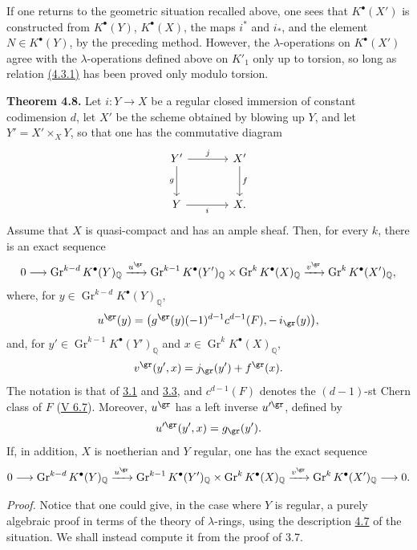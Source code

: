 If one returns to the geometric situation recalled above, one sees that \(K^\bullet(X')\) is constructed from \(K^\bullet(Y)\), \(K^\bullet(X)\), the maps \(i^*\) and \(i_*\), and the element \(N\in K^\bullet(Y)\), by the preceding method. However, the \(\lambda\)-operations on \(K^\bullet(X')\) agree with the \(\lambda\)-operations defined above on \(K'_1\) only up to torsion, so long as relation \hyperlink{sga6.e07.eq.4-3-1}{(4.3.1)} has been proved only modulo torsion.

\textbf{Theorem 4.8.} Let \(i:Y\to X\) be a regular closed immersion of constant codimension \(d\), let \(X'\) be the scheme obtained by blowing up \(Y\), and let \(Y'=X'\times_XY\), so that one has the commutative diagram
\[
\begin{tikzcd}[column sep=large,row sep=large]
Y' \arrow[r,"j"] \arrow[d,"g"'] & X' \arrow[d,"f"]\\
Y \arrow[r,"i"'] & X.
\end{tikzcd}
\]
Assume that \(X\) is quasi-compact and has an ample sheaf. Then, for every \(k\), there is an exact sequence
\[
0\longrightarrow
\operatorname{Gr}^{k-d}K^\bullet(Y)_{\mathbb Q}
\xrightarrow{u^{\gr}}
\operatorname{Gr}^{k-1}K^\bullet(Y')_{\mathbb Q}
\times
\operatorname{Gr}^{k}K^\bullet(X)_{\mathbb Q}
\xrightarrow{v^{\gr}}
\operatorname{Gr}^{k}K^\bullet(X')_{\mathbb Q},
\]
where, for \(y\in \operatorname{Gr}^{k-d}K^\bullet(Y)_{\mathbb Q}\),
\[
  u^{\gr}(y)=
  \bigl(g^{\gr}(y)(-1)^{d-1}c^{d-1}(F),-\,i_{\gr}(y)\bigr),
\]
and, for \(y'\in \operatorname{Gr}^{k-1}K^\bullet(Y')_{\mathbb Q}\) and \(x\in \operatorname{Gr}^{k}K^\bullet(X)_{\mathbb Q}\),
\[
  v^{\gr}(y',x)=j_{\gr}(y')+f^{\gr}(x).
\]
The notation is that of \hyperlink{sga6.e07.para.3-1}{3.1} and \hyperlink{sga6.e07.para.3-3}{3.3}, and \(c^{d-1}(F)\) denotes the \((d-1)\)-st Chern class of \(F\) (\hyperlink{sga6.e05.para.6-7}{V 6.7}). Moreover, \(u^{\gr}\) has a left inverse \(u'^{\gr}\), defined by
\[
  u'^{\gr}(y',x)=g_{\gr}(y').
\]
If, in addition, \(X\) is noetherian and \(Y\) regular, one has the exact sequence
\[
0\longrightarrow
\operatorname{Gr}^{k-d}K^\bullet(Y)_{\mathbb Q}
\xrightarrow{u^{\gr}}
\operatorname{Gr}^{k-1}K^\bullet(Y')_{\mathbb Q}
\times
\operatorname{Gr}^{k}K^\bullet(X)_{\mathbb Q}
\xrightarrow{v^{\gr}}
\operatorname{Gr}^{k}K^\bullet(X')_{\mathbb Q}
\longrightarrow0.
\]

\emph{Proof.} Notice that one could give, in the case where \(Y\) is regular, a purely algebraic proof in terms of the theory of \(\lambda\)-rings, using the description \hyperlink{sga6.e07.sec.4.7}{4.7} of the situation. We shall instead compute it from the proof of 3.7.

